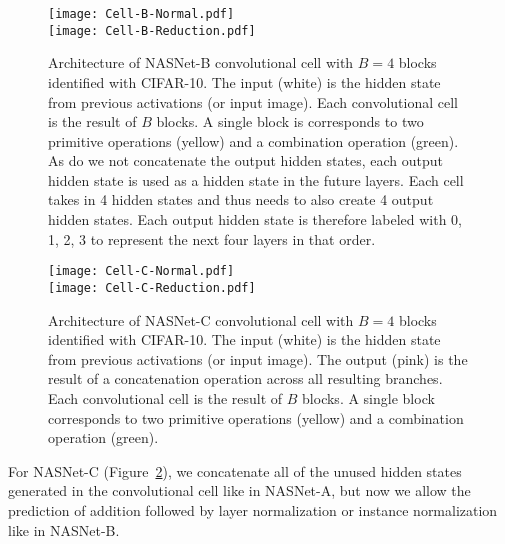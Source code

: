 \documentclass[10pt,twocolumn,letterpaper]{article}
\begin{document}
\begin{figure}[h!]
\begin{center}
\texttt{[image: Cell-B-Normal.pdf]} \\
\vspace{0.4cm}
\texttt{[image: Cell-B-Reduction.pdf]}
\caption{Architecture of NASNet-B convolutional cell with $B=4$ blocks identified with CIFAR-10. The input (white) is the hidden state from previous activations (or input image).
Each convolutional cell is the result of $B$ blocks.
A single block is corresponds to two primitive operations (yellow) and a combination operation (green). As do we not concatenate the output hidden states, each output hidden state is used as a hidden state in the future layers. Each cell takes in 4 hidden states and thus needs to also create 4 output hidden states. Each output hidden state is therefore labeled with 0, 1, 2, 3 to represent the next four layers in that order.
}
\label{figure:cell_structure_b}
\end{center}
\end{figure}\begin{figure}[h!]
\begin{center}
\texttt{[image: Cell-C-Normal.pdf]} \\
\vspace{0.4cm}
\texttt{[image: Cell-C-Reduction.pdf]}
\caption{Architecture of NASNet-C convolutional cell with $B=4$ blocks identified with CIFAR-10. The input (white) is the hidden state from previous activations (or input image). The output (pink) is the result of a concatenation operation across all resulting branches.
Each convolutional cell is the result of $B$ blocks.
A single block corresponds to two primitive operations (yellow) and a combination operation (green). 
}
\label{figure:cell_structure_c}
\end{center}
\end{figure}

For NASNet-C (Figure~\ref{figure:cell_structure_c}), we concatenate all of the unused hidden states generated in the convolutional cell like in NASNet-A, but now we allow the prediction of addition followed by layer normalization or instance normalization like in NASNet-B.
\end{document}
